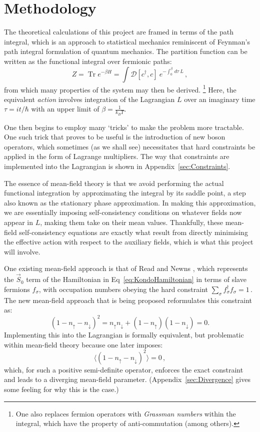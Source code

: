 \documentclass[12pt]{article}
\DeclareMathOperator{\Tr}{Tr}
\begin{document}

\section{Methodology} %

The theoretical calculations of this project are framed in terms of the path integral, which is an approach to statistical mechanics reminiscent of Feynman's path integral formulation of quantum mechanics. The partition function can be written as the functional integral over fermionic paths: $$ Z = \Tr{e^{- \beta H}} = \int \mathcal{D} [c^\dagger, c]~e^{-\int_{0}^{\beta} \,d\tau~L}\,, $$ from which many properties of the system may then be derived. \footnote{One also replaces fermion operators with \emph{Grassman numbers} within the integral, which have the property of anti-commutation (among others).} Here, the equivalent \emph{action} involves integration of the Lagrangian $ L $ over an imaginary time $ \tau = i t / \hbar $ with an upper limit of $ \beta = \frac{1}{k_B T} $.

One then begins to employ many `tricks' to make the problem more tractable. One such trick that proves to be useful is the introduction of new boson operators, which sometimes (as we shall see) necessitates that hard constraints be applied in the form of Lagrange multipliers. The way that constraints are implemented into the Lagrangian is shown in Appendix~\ref{sec:Constraints}.

The essence of mean-field theory is that we avoid performing the actual functional integration by approximating the integral by its saddle point, a step also known as the stationary phase approximation. In making this approximation, we are essentially imposing self-consistency conditions on whatever fields now appear in $ L $, making them take on their mean values. Thankfully, these mean-field self-consistency equations are exactly what result from directly minimising the effective action with respect to the auxiliary fields, which is what this project will involve.

One existing mean-field approach is that of Read and Newns \cite{ReadNewns}, which represents the $ \vec{S}_0 $ term of the Hamiltonian in Eq~\eqref{eq:KondoHamiltonian} in terms of slave fermions $ f^{}_{\sigma} $, with occupation numbers obeying the hard constraint $ \sum_{\sigma} f^{\dagger}_{\sigma} f^{}_{\sigma} = 1 \,. $ The new mean-field approach that is being proposed reformulates this constraint as: \begin{equation} (1 - n_{\uparrow} - n_{\downarrow})^2 = n_{\uparrow} n_{\downarrow} + (1 - n_{\uparrow})(1 - n_{\downarrow}) = 0 . \label{eq:HardConstraint}\end{equation} Implementing this into the Lagrangian is formally equivalent, but problematic within mean-field theory because one later imposes: \[ \langle (1 - n_{\uparrow} - n_{\downarrow})^2 \rangle = 0\,, \] which, for such a positive semi-definite operator, enforces the exact constraint and leads to a diverging mean-field parameter. (Appendix~\ref{sec:Divergence} gives some feeling for why this is the case.)
\end{document}
